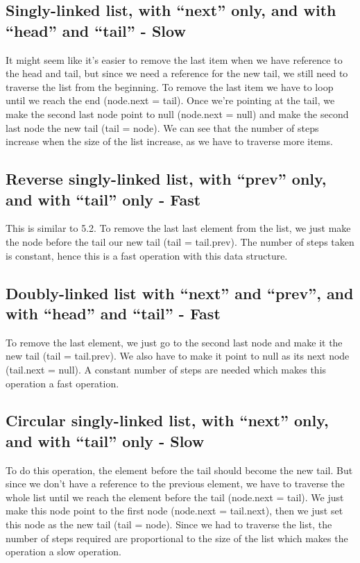 \documentclass{article}
\begin{document}
\subsection{Singly-linked list, with “next” only, and with “head” and “tail” - Slow}
It might seem like it's easier to remove the last item when we have reference to the head and tail, but since we need a reference for the new tail, we still need to traverse the list from the beginning. To remove the last item we have to loop until we reach the end (node.next = tail). Once we're pointing at the tail, we make the second last node point to null (node.next = null) and make the second last node the new tail (tail = node). We can see that the number of steps increase when the size of the list increase, as we have to traverse more items.

\subsection{Reverse singly-linked list, with “prev” only, and with “tail” only - Fast}
This is similar to 5.2. To remove the last last element from the list, we just make the node before the tail our new tail (tail = tail.prev). The number of steps taken is constant, hence this is a fast operation with this data structure.

\subsection{Doubly-linked list with “next” and “prev”, and with “head” and “tail” - Fast}
To remove the last element, we just go to the second last node and make it the new tail (tail = tail.prev). We also have to make it point to null as its next node (tail.next = null). A constant number of steps are needed which makes this operation a fast operation.

\subsection{Circular singly-linked list, with “next” only, and with “tail” only - Slow}
To do this operation, the element before the tail should become the new tail. But since we don't have a reference to the previous element, we have to traverse the whole list until we reach the element before the tail (node.next = tail). We just make this node point to the first node (node.next = tail.next), then we just set this node as the new tail (tail = node). Since we had to traverse the list, the number of steps required are proportional to the size of the list which makes the operation a slow operation.
\end{document}
